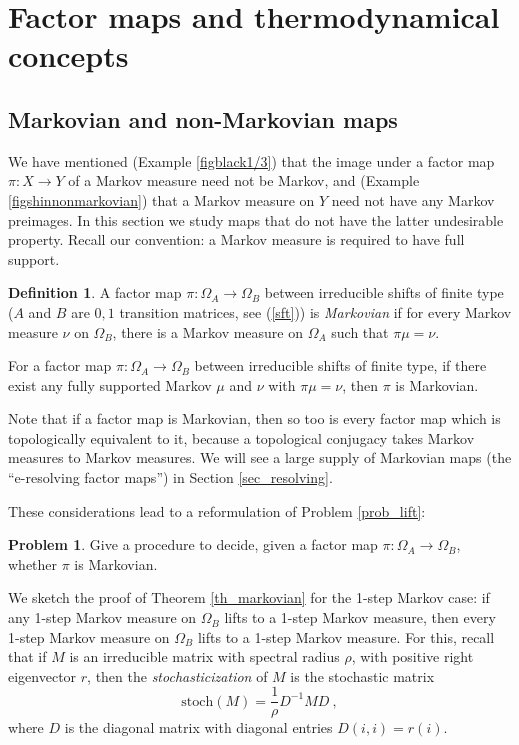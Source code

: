 \documentclass{kepart2010}
\theoremstyle{plain}
\theoremstyle{definition}
\newtheorem{defn}[thm]{Definition}
\newtheorem{prob}[thm]{Problem}
\theoremstyle{remark}
\theoremstyle{definition}
\numberwithin{equation}{section}
\begin{document}
\section{Factor maps and thermodynamical
concepts}\label{sec_mapsandthermo}

\subsection{Markovian and non-Markovian maps}\label{sec_markovian}

We have mentioned (Example \ref{figblack1/3}) that the image under a
factor map $\pi: X \to Y$ of a Markov measure need not be Markov,
and (Example \ref{figshinnonmarkovian}) that a Markov measure on $Y$
need not have any Markov preimages. In this section we study maps
that do not have the latter undesirable property.
Recall our convention: a Markov measure
is required to have full support.
\begin{defn}\cite{BoyleTuncel1984}
A factor map $\pi : \Omega_A \to \Omega_B$ between irreducible
shifts of finite type ($A$ and $B$ are $0,1$ transition matrices,
see (\ref{sft})) is {\em Markovian} if for every  Markov measure
$\nu$ on $\Omega_B$, there is a Markov measure on $\Omega_A$ such
that $\pi \mu = \nu$.
\end{defn}
\begin{thm}\label{th_markovian}\cite{BoyleTuncel1984} For a factor map $\pi: \Omega_A \to
  \Omega_B$ between irreducible
shifts of finite type, if there exist
any fully supported Markov $\mu$ and $\nu$ with $\pi \mu = \nu$,
then  $\pi$ is Markovian.
\end{thm}

Note that if a factor map is Markovian, then so too is every factor
map which is topologically equivalent to it, because a topological
conjugacy takes Markov  measures to Markov measures. We will see a
large supply of Markovian maps (the ``e-resolving factor maps'') in
Section  \ref{sec_resolving}.

These considerations lead to a reformulation of Problem
\ref{prob_lift}:
\begin{prob}\label{prob_markovianmap}
Give a procedure to decide, given a factor map $\pi: \Omega_A \to
\Omega_B$, whether $\pi$ is Markovian.
\end{prob}

We sketch the proof of Theorem \ref{th_markovian} for the 1-step
Markov case: if any 1-step Markov measure on $\Omega_B$ lifts to a
1-step Markov measure, then every 1-step Markov measure on
$\Omega_B$ lifts to a 1-step Markov measure. For this, recall that
if $M$ is an irreducible matrix with spectral radius $\rho$, with
positive right eigenvector $r$, then the {\em stochasticization} of
$M$ is the stochastic matrix \begin{equation} \label{stochasticization}
\text{stoch}(M)= \frac 1\rho D^{-1}MD \ , \end{equation} where $D$ is the
diagonal matrix with diagonal entries $D(i,i)=r(i)$.
\end{document}
